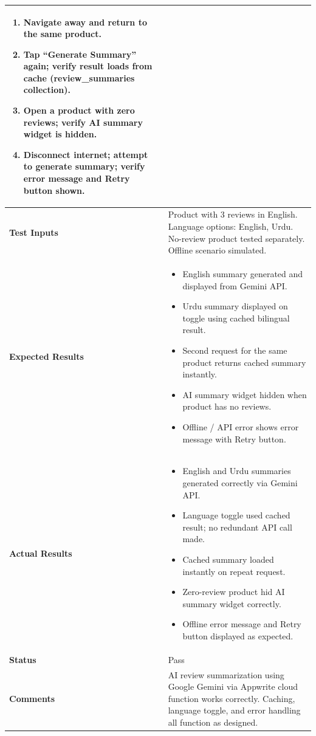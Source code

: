\begin{table}[H]
\begin{tabular}{|p{3.2cm}|p{10.8cm}|}
\begin{enumerate}[leftmargin=*,noitemsep]
\item Navigate away and return to the same product.
\item Tap ``Generate Summary'' again; verify result loads from cache (review\_summaries collection).
\item Open a product with zero reviews; verify AI summary widget is hidden.
\item Disconnect internet; attempt to generate summary; verify error message and Retry button shown.
\end{enumerate} \\ \hline
\textbf{Test Inputs} & Product with 3 reviews in English. Language options: English, Urdu. No-review product tested separately. Offline scenario simulated. \\ \hline
\textbf{Expected Results} &
\begin{itemize}[leftmargin=*,noitemsep]
\item English summary generated and displayed from Gemini API.
\item Urdu summary displayed on toggle using cached bilingual result.
\item Second request for the same product returns cached summary instantly.
\item AI summary widget hidden when product has no reviews.
\item Offline / API error shows error message with Retry button.
\end{itemize} \\ \hline
\textbf{Actual Results} &
\begin{itemize}[leftmargin=*,noitemsep]
\item English and Urdu summaries generated correctly via Gemini API.
\item Language toggle used cached result; no redundant API call made.
\item Cached summary loaded instantly on repeat request.
\item Zero-review product hid AI summary widget correctly.
\item Offline error message and Retry button displayed as expected.
\end{itemize} \\ \hline
\textbf{Status} & Pass \\ \hline
\textbf{Comments} & AI review summarization using Google Gemini via Appwrite cloud function works correctly. Caching, language toggle, and error handling all function as designed. \\ \hline
\end{tabular}
\end{table}

